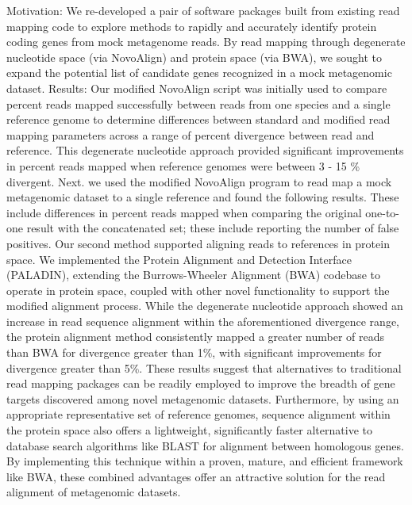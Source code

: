 Motivation: We re-developed a pair of software packages built from existing read mapping code to explore methods to rapidly and accurately identify protein coding genes from mock metagenome reads. By read mapping through degenerate nucleotide space (via NovoAlign) and protein space (via BWA), we sought to expand the potential list of candidate genes recognized in a mock metagenomic dataset.
Results: Our modified NovoAlign script was initially used to compare percent reads mapped successfully between reads from one species and a single reference genome to determine differences between standard and modified read mapping parameters across a range of percent divergence between read and reference. This degenerate nucleotide approach provided significant improvements in percent reads mapped when reference genomes were between 3 - 15 \% divergent. Next. we used the modified NovoAlign program to read map a mock metagenomic dataset to a single reference and found the following results. These include differences in percent reads mapped when comparing the original one-to-one result with the concatenated set; these include reporting the number of false positives. 
Our second method supported aligning reads to references in protein space.  We implemented the Protein Alignment and Detection Interface (PALADIN), extending the Burrows-Wheeler Alignment (BWA) codebase to operate in protein space, coupled with other novel functionality to support the modified alignment process.  While  the degenerate nucleotide approach showed an increase in read sequence alignment within the aforementioned divergence range, the protein alignment method consistently mapped a greater number of reads than BWA for divergence greater than 1\%, with significant improvements for divergence greater than 5\%.  
These results suggest that alternatives to traditional read mapping packages can be readily employed to improve the breadth of gene targets discovered among novel metagenomic datasets. Furthermore, by using an appropriate representative set of reference genomes, sequence alignment within the protein space also offers a lightweight, significantly faster alternative to database search algorithms like BLAST for alignment between homologous genes.  By implementing this technique within a proven, mature, and efficient framework like BWA, these combined advantages offer an attractive solution for the read alignment of metagenomic datasets.

